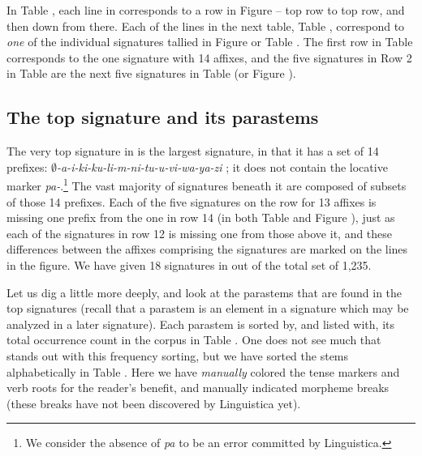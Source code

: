 \documentclass[output=paper,colorlinks,citecolor=brown]{langscibook}
\begin{document}
In Table ,  each line in corresponds to a row in Figure  -- top row to top row, and then down from there. Each of the lines in the next table, Table , correspond to \textit{one} of the individual signatures tallied in  Figure  or Table . The first row in Table  corresponds to the one signature with 14 affixes, and the five signatures in Row 2 in Table  are the next five signatures in Table  (or Figure ). 




\subsection{The top signature and its parastems}
The very top signature in  is the largest signature, in that it has a  set of 14 prefixes: \textit{$\emptyset$-a-i-ki-ku-li-m-ni-tu-u-vi-wa-ya-zi} ; it does not contain the locative marker \textit{pa-}.\footnote{We consider the absence of \textit{pa} to be an error committed by Linguistica.} The vast majority of signatures beneath it are composed of subsets of those 14 prefixes. Each of the five signatures on the row for 13 affixes is missing one prefix from the one in row 14 (in both Table  and Figure ), just as each of the signatures in row 12 is missing one from those above it, and these differences between the affixes comprising the signatures are marked on the lines in the figure. We have given 18 signatures in  out of the total set of 1,235. 
 
Let us dig a little more deeply, and look at the parastems that are found in the top signatures (recall that a parastem is an element in a signature which may be analyzed in a later signature). Each parastem is sorted by, and listed with, its total occurrence count in the corpus in Table . One does not see much that stands out with this frequency sorting, but we have sorted the stems alphabetically in Table . Here we have \textit{manually} colored the tense markers and verb roots for the reader's benefit, and manually indicated morpheme breaks (these breaks have not been discovered by Linguistica yet). 
  
  
\end{document}
